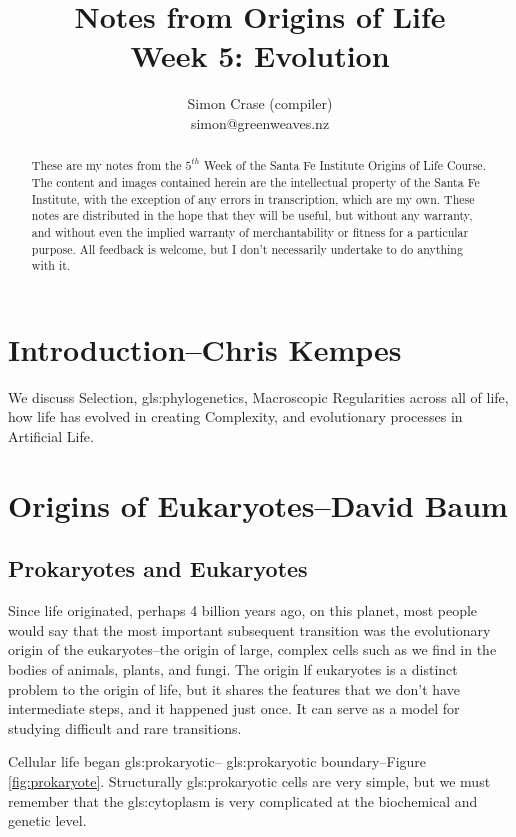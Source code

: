 \documentclass[]{article}
\title{
	Notes from Origins of Life\\
	Week 5: Evolution}
\author{Simon Crase (compiler)\\simon@greenweaves.nz}
\begin{document}
\maketitle

\begin{abstract}
   These are my notes from the $5^{th}$ Week of the Santa Fe Institute Origins of Life Course\cite{sfi2020}. 
   The content and images contained herein are the intellectual property of the Santa Fe Institute, with the exception of any errors in transcription, which are my own.
   These notes are distributed in the hope that they will be useful,
   but without any warranty, and without even the implied warranty of
   merchantability or fitness for a particular purpose. All feedback is welcome,
   but I don't necessarily undertake to do anything with it.
\end{abstract}

\setcounter{tocdepth}{2}
\tableofcontents
\listoffigures

\section[Introduction]{Introduction--Chris Kempes}

We discuss Selection, \gls{gls:phylogenetics}, Macroscopic Regularities across all of life, how  life has evolved in creating Complexity, and evolutionary processes in Artificial Life. 

\section[Origins of Eukaryotes]{Origins of Eukaryotes--David Baum}

\subsection{Prokaryotes and Eukaryotes}

Since life originated, perhaps 4 billion years ago, on this planet, most people would say that the most important subsequent transition was the evolutionary origin of the eukaryotes--the origin of large, complex cells such as we find in the bodies of animals, plants, and fungi. The origin lf eukaryotes is a distinct problem to the origin of life, but it shares the features that we don't have intermediate steps, and it happened just once. It can serve as a model for studying difficult and rare transitions.

Cellular life began \gls{gls:prokaryotic}-- \glsdesc{gls:prokaryotic}
boundary--Figure \ref{fig:prokaryote}. Structurally \gls{gls:prokaryotic} cells are very simple, but we must remember that the \gls{gls:cytoplasm} is very complicated at the biochemical and genetic level.
\end{document}
